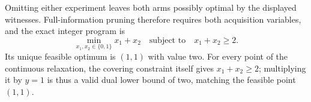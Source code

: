 Omitting either experiment leaves both arms possibly optimal by the displayed witnesses. Full-information pruning therefore requires both acquisition variables, and the exact integer program is
\[
\min_{x_1,x_2\in\{0,1\}}x_1+x_2
\quad\text{subject to}\quad x_1+x_2\geq2.
\]
Its unique feasible optimum is \((1,1)\) with value two. For every point of the continuous relaxation, the covering constraint itself gives \(x_1+x_2\geq2\); multiplying it by \(y=1\) is thus a valid dual lower bound of two, matching the feasible point \((1,1)\).